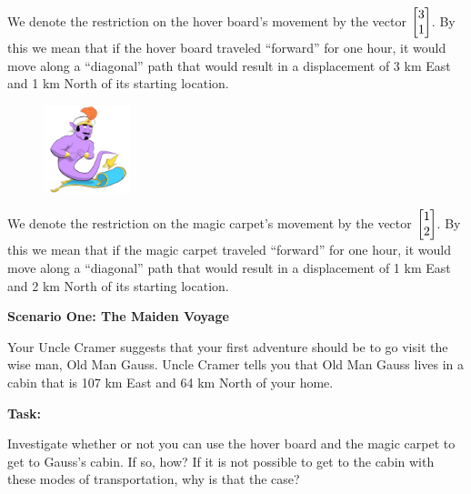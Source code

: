 \begin{iola}
\begin{slide}
\begin{minipage}{\linewidth}
	We denote the restriction on the hover board's movement by the vector
	$\mat{3 \\1}$. By this we mean that if
	the hover board traveled ``forward'' for one hour, it would move along a
	``diagonal'' path that would result in a displacement of 3 km East and
	1 km North of its starting location.
\end{minipage}

\begin{minipage}{\linewidth}
	\vspace{.5cm}
	\begin{figure}
	\vspace{-.8cm}
	\includegraphics[width=1in]{images/MagicCarpet-small.png}
	\end{figure}

	We denote the restriction on the magic carpet's movement by the vector
	$\mat{1 \\2 }$. By this we mean that if the
	magic carpet traveled ``forward'' for one hour, it would move along a
	``diagonal'' path that would result in a displacement of 1 km East and
	2 km North of its starting location.
\end{minipage}


\vspace{10mm}
\end{slide}

\begin{slide}
\textbf{Scenario One: The Maiden Voyage}

Your Uncle Cramer suggests that your first adventure should be to go visit
the wise man, Old Man Gauss. Uncle Cramer tells you that Old Man Gauss
lives in a cabin that is 107 km East and 64 km North of your home.

\vspace{5mm}

\textbf{Task:}
\par
Investigate whether or not you can use the hover board and the magic
carpet to get to Gauss's cabin. If so, how? If it is not possible to
get to the cabin with these modes of transportation, why is that the case?

\end{slide}
\end{iola}

